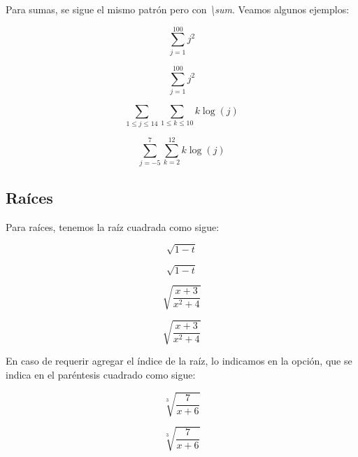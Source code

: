 \documentclass[graybox,envcountchap,sectrefs]{svmono}
\begin{document}
        Para sumas, se sigue el mismo patrón pero con \emph{\textbackslash sum}. Veamos algunos ejemplos:
\begin{tcbraster}[raster columns=2, raster equal height]
    \begin{code}
        \[ \sum_{j=1}^{100} j^2\]
    \end{code}
    \begin{compiled}
        \[ \sum_{j=1}^{100} j^2\]
    \end{compiled}
    \end{tcbraster}
\begin{tcbraster}[raster columns=2, raster equal height]
    \begin{code}
        \[ \sum_{1\leq j \leq 14} \sum_{1\leq k \leq 10} k\log(j) \]
    \end{code}
    \begin{compiled}
        \[ \sum_{j=-5}^{7} \sum_{k=2}^{12} k\log(j) \]
    \end{compiled}
    \end{tcbraster}

    \subsection{Raíces}
        Para raíces, tenemos la raíz cuadrada como sigue:
\begin{tcbraster}[raster columns=2, raster equal height]
    \begin{code}
        \[ \sqrt{1-t} \]
    \end{code}
    \begin{compiled}
        \[ \sqrt{1-t} \]
    \end{compiled}
    \end{tcbraster}


\begin{tcbraster}[raster columns=2, raster equal height]
    \begin{code}
        \[ \sqrt{\frac{x+3}{x^2+4}} \]
    \end{code}
    \begin{compiled}
        \[ \sqrt{\frac{x+3}{x^2+4}} \]
    \end{compiled}
    \end{tcbraster}

    En caso de requerir agregar el índice de la raíz, lo indicamos en la opción, 
    que se indica en el paréntesis cuadrado como sigue:

\begin{tcbraster}[raster columns=2, raster equal height]
    \begin{code}
        \[ \sqrt[3]{\frac{7}{x+6}} \]
    \end{code}
    \begin{compiled}
        \[ \sqrt[3]{\frac{7}{x+6}} \]
    \end{compiled}
    \end{tcbraster}
\end{document}
